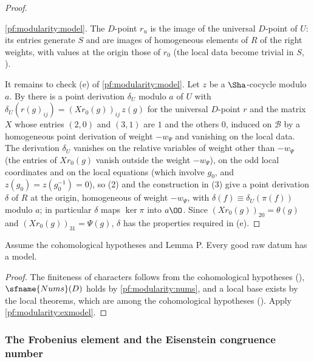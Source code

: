\begin{proof}
\begin{enumerate}[label=(\arabic*)]
\cref{pf:modularity:model}. The $D$-point $r_u$ is the image of the universal $D$-point of $U$: its entries generate $S$
and are images of homogeneous elements of $R$ of the right weights, with values at the origin those of $r_0$ (the local
data become trivial in $S$, ).
\end{enumerate}
It remains to check (e) of \cref{pf:modularity:model}. Let $z$ be a $\Sha$-cocycle modulo $a$. By
 there is a point derivation $\delta_U$ modulo $a$ of $U$ with
$\delta_U(r(g)_{ij})=(Xr_0(g))_{ij}\,z(g)$ for the universal $D$-point $r$ and the matrix $X$ whose entries $(2,0)$ and
$(3,1)$ are $1$ and the others $0$, induced on $\mathcal B$ by a homogeneous point derivation of weight $-w_\Psi$ and
vanishing on the local data. The derivation $\delta_U$ vanishes on the relative variables of weight other than $-w_\Psi$
(the entries of $Xr_0(g)$ vanish outside the weight $-w_\Psi$), on the odd local coordinates and on the local equations
(which involve $g_0$, and $z(g_0)=z(g_0^{-1})=0$), so (2) and the construction in (3) give a point derivation $\delta$ of
$R$ at the origin, homogeneous of weight $-w_\Psi$, with $\delta(f)\equiv\delta_U(\pi(f))$ modulo $a$; in particular
$\delta$ maps $\ker\pi$ into $a\OO$. Since $(Xr_0(g))_{20}=\theta(g)$ and $(Xr_0(g))_{31}=\Psi(g)$, $\delta$ has the
properties required in (e).
\end{proof}

\begin{corollary}\label{pf:modularity:exmodel2}
Assume the cohomological hypotheses and Lemma P. Every good raw datum has a model.
\end{corollary}

\begin{proof}
The finiteness of characters follows from the cohomological hypotheses
(), $\sfname{Nums}(D)$ holds by \cref{pf:modularity:nums},
and a local base exists by the local theorems, which are among the cohomological hypotheses
(). Apply \cref{pf:modularity:exmodel}.
\end{proof}

\subsubsection{The Frobenius element and the Eisenstein congruence number}

